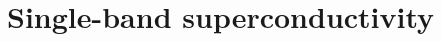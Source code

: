 \documentclass[aps,prb,reprint,noeprint,superscriptaddress]{revtex4-2}
\begin{document}
\section{Single-band superconductivity}

\end{document}
